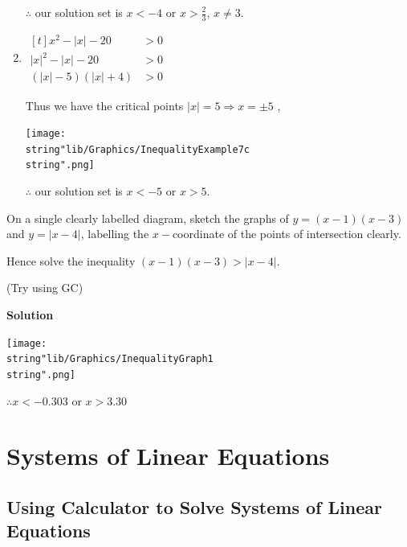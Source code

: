 \documentclass[11pt,a4paper]{book}
\begin{document}
\begin{example}
\begin{enumerate}[label=(\alph*)]
$\therefore$ our solution set is $x<-4$ or ${\displaystyle x>\frac{2}{3}}$, $x\neq3$.

\item
$
\begin{aligned}[t]
x^{2}-\left|x\right|-20 & >0\\
\left|x\right|^{2}-\left|x\right|-20 & >0\\
\left(\left|x\right|-5\right)\left(\left|x\right|+4\right) & >0
\end{aligned}
$

Thus we have the critical points $\left|x\right|=5\Rightarrow x=\pm5$
,
\begin{center}
\texttt{[image: \\string"lib/Graphics/InequalityExample7c\\string".png]}
\par\end{center}

$\therefore$ our solution set is ${\displaystyle x<-5}$ or $x>5$.

\end{enumerate}
\end{example}

\newpage

\begin{example}
On a single clearly labelled diagram, sketch the graphs of $y=\left(x-1\right)\left(x-3\right)$
and $y=\left|x-4\right|$, labelling the $x-$coordinate of the points
of intersection clearly.

Hence solve the inequality $\left(x-1\right)\left(x-3\right)>\left|x-4\right|$.

(Try using GC)

\textbf{Solution}
\begin{center}
\texttt{[image: \\string"lib/Graphics/InequalityGraph1\\string".png]}
\par\end{center}

$\therefore x<-0.303$ or $x>3.30$
\end{example}

\newpage

\section{Systems of Linear Equations }

\subsection{Using Calculator to Solve Systems of Linear Equations}
\end{document}
